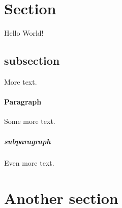 \documentclass{article}
\begin{document}
	\section{Section}
	Hello World!
	\subsection{subsection}
	More text.
	\paragraph{Paragraph}
	Some more text.
	\subparagraph{subparagraph}
	Even more text.
	\section{Another section}
\end{document}
